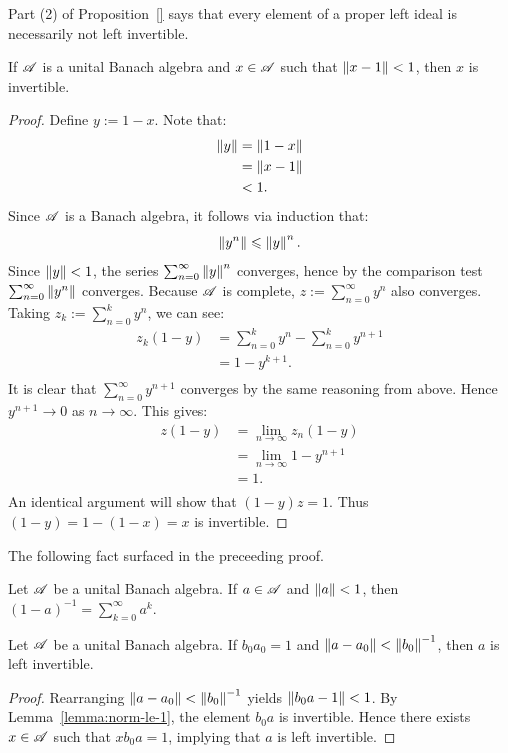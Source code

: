 \documentclass[reqno]{amsart}
\begin{document}
Part (2) of Proposition~\ref{} says that every element of a proper left ideal is necessarily not left invertible.

\begin{lemma}\label{lemma:norm-le-1}
	If $\mathscr{A}$ is a unital Banach algebra and $x \in \mathscr{A}$ such that $\left\lVert x-1 \right\rVert < 1$, then $x$ is invertible.
\end{lemma}
	\begin{proof}
		Define $y:=1-x$. Note that:
		\begin{align*}
			\left\lVert y \right\rVert
			&= \left\lVert 1-x \right\rVert \\
			&= \left\lVert x-1 \right\rVert \\
			&< 1.
		\end{align*}
		Since $\mathscr{A}$ is a Banach algebra, it follows via induction that:
		\[
			\left\lVert y^n \right\rVert \leqslant \left\lVert y \right\rVert^n.
		\]
		Since $\left\lVert y \right\rVert < 1$, the series $\sum_{n=0}^{\infty} \left\lVert y \right\rVert^n$ converges, hence by the comparison test $\sum_{n=0}^{\infty} \left\lVert y^n \right\rVert$ converges. Because $\mathscr{A}$ is complete, $z:=\sum_{n=0}^{\infty}y^n$ also converges. Taking $z_k := \sum_{n=0}^{k}y^n$, we can see:
		\begin{align*}
			z_k(1-y)
			&= \sum_{n=0}^{k} y^n - \sum_{n=0}^{k} y^{n+1} \\
			&= 1-y^{k+1}. \\
		\end{align*}
		It is clear that $\sum_{n=0}^{\infty} y^{n+1}$ converges by the same reasoning from above. Hence $y^{n+1} \rightarrow 0$ as $n \rightarrow \infty$. This gives:
		\begin{align*}
			z(1-y)
			&= \lim_{n \rightarrow \infty}z_n(1-y) \\
			&= \lim_{n \rightarrow \infty}1-y^{n+1} \\
			&= 1. \\
		\end{align*}
		An identical argument will show that $(1-y)z = 1$. Thus $(1-y) = 1-(1-x) = x$ is invertible.
	\end{proof}

The following fact surfaced in the preceeding proof.

\begin{corollary}\label{cor:power-series-basic}
	Let $\mathscr{A}$ be a unital Banach algebra. If $a \in \mathscr{A}$ and $\left\lVert a \right\rVert < 1$, then $(1-a)^{-1} = \sum_{k=0}^{\infty} a^k$.
\end{corollary}

\begin{lemma}\label{lemma:inverse-pertubation}
	Let $\mathscr{A}$ be a unital Banach algebra. If $b_0 a_0 = 1$ and $\left\lVert a - a_0 \right\rVert < \left\lVert b_0 \right\rVert^{-1}$, then $a$ is left invertible. 
\end{lemma}	
	\begin{proof}
		Rearranging $\left\lVert a-a_0 \right\rVert < \left\lVert b_0 \right\rVert^{-1}$ yields $\left\lVert b_0 a - 1 \right\rVert < 1$. By Lemma~\ref{lemma:norm-le-1}, the element $b_0a$ is invertible. Hence there exists $x \in \mathscr{A}$ such that $xb_0a = 1$, implying that $a$ is left invertible.
	\end{proof}
\end{document}
